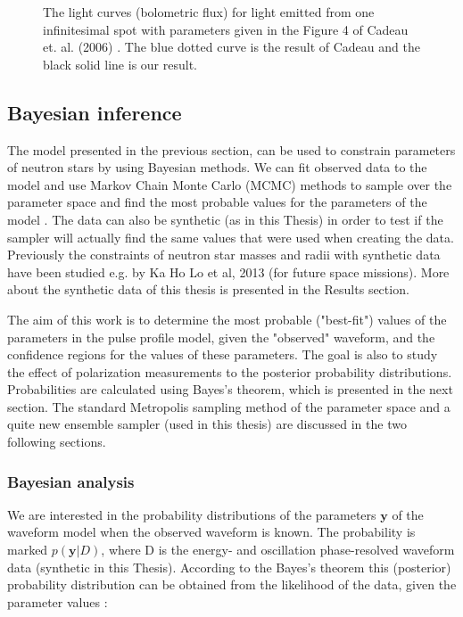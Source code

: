\documentclass{wihuri}
\begin{document}
\begin{figure}
\centerline{}
\caption{The light curves (bolometric flux) for light emitted from one infinitesimal spot with parameters given in the Figure 4 of Cadeau et. al. (2006) \cite{cadeau}. The blue dotted curve is the result of Cadeau and the black solid line is our result.
\label{fig:cad4}}
\end{figure}




\subsection{Bayesian inference}



The model presented in the previous section, can be used to constrain parameters of neutron stars by using Bayesian methods. We can fit observed data to the model and use Markov Chain Monte Carlo  (MCMC) methods to sample over the parameter space and find the most probable values for the parameters of the model \cite{mc_methods_book}. The data can also be synthetic (as in this Thesis) in order to test if the sampler will actually find the same values that were used when creating the data. Previously the constraints of neutron star masses and radii with synthetic data have been studied e.g. by Ka Ho Lo et al, 2013 \cite{miller} (for future space missions). More about the synthetic data of this thesis is presented in the Results section. 

The aim of this work is to determine the most probable ("best-fit") values of the parameters in the pulse profile model, given the "observed" waveform, and the confidence regions for the values of these parameters. The goal is also to study the effect of polarization measurements to the posterior probability distributions. Probabilities are calculated using Bayes's theorem, which is presented in the next section. The standard Metropolis sampling method of the parameter space and a quite new ensemble sampler (used in this thesis) are discussed in the two following sections. 

\subsubsection{Bayesian analysis}

We are interested in the probability distributions of the parameters $\textbf{y}$ of the waveform model when the observed waveform is known. The probability is marked $p(\textbf{y}|D)$, where D is the energy- and oscillation phase-resolved waveform data (synthetic in this Thesis). According to the Bayes's theorem this (posterior) probability distribution can be obtained from the likelihood of the data, given the parameter values \cite{nattila_bayes}:
\end{document}
